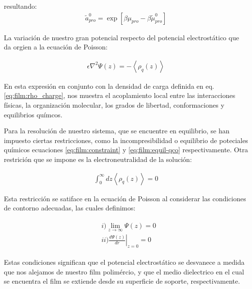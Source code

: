  resultando:
\begin{align}
	\tilde{a}^0_{pro} = \exp[\beta\mu_{pro} - \beta\tilde{\mu}^0_{pro}]
	\label{eq:film:actividad-pro}
\end{align}

La variaci\'on de nuestro gran potencial respecto del potencial electrost\'atico que da orgien a la ecuaci\'on de Poisson:

\begin{align}
	\epsilon \nabla^2 \Psi(z) = - \left< \rho_q (z)\right>
\end{align}

En esta expresi\'on en conjunto con  la densidad de carga definida en eq. \ref{eq:film:rho_charge}, nos muestra el acoplamiento local entre las interacciones f\'isicas, la organizaci\'on molecular, los grados de libertad, conformaciones y equilibrios qu\'imcos. 

Para la resoluci\'on de nuestro sistema, que se encuentre en equilibrio, se han impuesto ciertas restricciones, como la incompresibilidad o equilibrio de poteciales qu\'imicos ecuaciones \ref{eq:film:constraint} y \ref{eq:film:equil-qco} respectivamente. Otra restrici\'on que se impone es la electroneutralidad de la soluci\'on: 

\begin{align}
	\int_0^\infty dz \left< \rho_q (z)\right> = 0
\end{align}

Esta restricci\'on se satiface en la ecuaci\'on de Poisson al considerar las condiciones de contorno adecuadas, las cuales definimos:

\begin{align}
	\begin{aligned}
		&i)  \lim_{z\to\infty}\Psi(z) = 0 \\
		&ii) \left.\frac{d\Psi(z)}{dr}\right|_{z=0} = 0
		\label{eq:film:contorno}
	\end{aligned}
\end{align}

Estas condiciones significan que el potencial electrost\'atico se desvanece a medida que nos alejamos de nuestro film polim\'ercio,  y que el medio dielectrico en el cual se encuentra el film  se extiende desde su superficie de soporte, respectivamente. 

